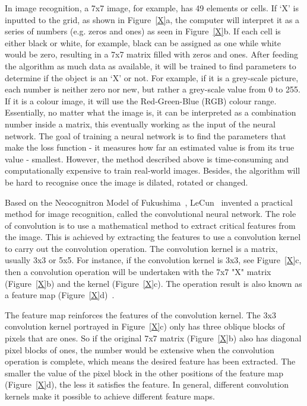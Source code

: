 In image recognition, a 7x7 image, for example, has 49 elements or cells. If `X' is inputted to the grid, as shown in Figure~\ref{X}a, the computer will interpret it as a series of numbers (e.g. zeros and ones) as seen in Figure~\ref{X}b. If each cell is either black or white, for example, black can be assigned as one while white would be zero, resulting in a 7x7 matrix filled with zeros and ones. After feeding the algorithm as much data as available, it will be trained to find parameters to determine if the object is an `X' or not. For example, if it is a grey-scale picture, each number is neither zero nor new, but rather a grey-scale value from 0 to 255. If it is a colour image, it will use the Red-Green-Blue (RGB) colour range. Essentially, no matter what the image is, it can be interpreted as a combination number inside a matrix, this eventually working as the input of the neural network. The goal of training a neural network is to find the parameters that make the loss function - it measures how far an estimated value is from its true value - smallest. However, the method described above is time-consuming and computationally expensive to train real-world images. Besides, the algorithm will be hard to recognise once the image is dilated, rotated or changed.


Based on the Neocognitron Model of Fukushima~\cite{fukushima1982neocognitron}, LeCun~\cite{lecun1995convolutional} invented a practical method for image recognition, called the convolutional neural network. The role of convolution is to use a mathematical method to extract critical features from the image. This is achieved by extracting the features to use a convolution kernel to carry out the convolution operation. The convolution kernel is a matrix, usually 3x3 or 5x5. For instance, if the convolution kernel is 3x3, see Figure~\ref{X}c, then a convolution operation will be undertaken with the 7x7 "X" matrix (Figure~\ref{X}b) and the kernel (Figure~\ref{X}c). The operation result is also known as a feature map (Figure~\ref{X}d)~\cite{bouvrie2006notes}.


The feature map reinforces the features of the convolution kernel. The 3x3 convolution kernel portrayed in Figure~\ref{X}c) only has three oblique blocks of pixels that are ones. So if the original 7x7 matrix (Figure~\ref{X}b) also has diagonal pixel blocks of ones, the number would be extensive when the convolution operation is complete, which means the desired feature has been extracted. The smaller the value of the pixel block in the other positions of the feature map (Figure~\ref{X}d), the less it satisfies the feature. In general, different convolution kernels make it possible to achieve different feature maps.

